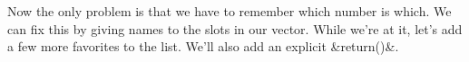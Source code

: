 \begin{knitrout}
\end{knitrout}

Now the only problem is that we have to remember which number is which.
We can fix this by giving names to the slots in our vector.
While we're at it, let's add a few more favorites to the list.
We'll also add an explicit &return()&.
%

